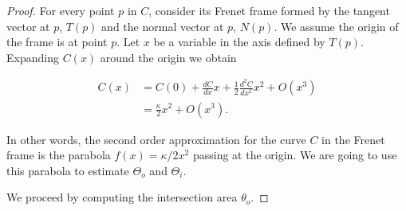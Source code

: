 \begin{proof} For every point $p$ in $C$, consider its Frenet frame formed by the tangent vector at $p$, $T(p)$ and the normal vector at $p$, $N(p)$. We assume the origin of the frame is at point $p$. Let $x$ be a variable in the axis defined by $T(p)$. Expanding $C(x)$ around the origin we obtain

\begin{align*}
	C(x) &= C(0) + \frac{dC}{dx}x + \frac{1}{2}\frac{d^2C}{dx^2}x^2 + O(x^3) \\
	&= \frac{\kappa}{2}x^2 + O(x^3).
\end{align*}

In other words, the second order approximation for the curve $C$ in the Frenet frame is the parabola $f(x) =  \kappa/2x^2$ passing at the origin. We are going to use this parabola to estimate $\Theta_o$ and $\Theta_i$.

We proceed by computing the intersection area $\theta_o$.



\end{proof}
